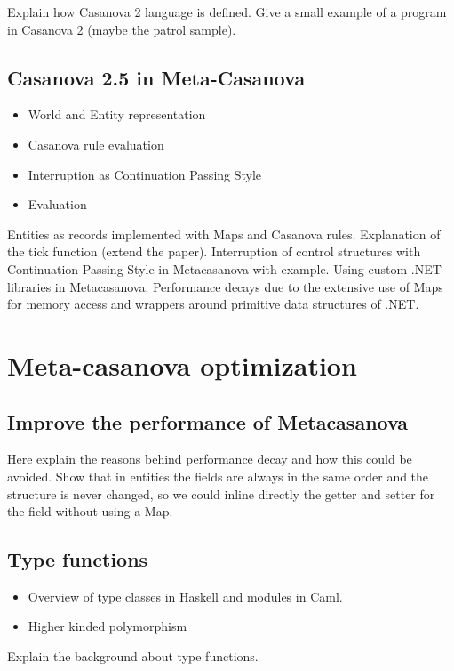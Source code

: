 \documentclass[8pt,a5paper]{extbook}
\begin{document}
Explain how Casanova 2 language is defined. Give a small example of a program in Casanova 2 (maybe the patrol sample). 
	
\section{Casanova 2.5 in Meta-Casanova}
\begin{itemize}[noitemsep]
	\item World and Entity representation
	\item Casanova rule evaluation
	\item Interruption as Continuation Passing Style
	\item Evaluation
\end{itemize}
	
Entities as records implemented with Maps and Casanova rules. Explanation of the tick function (extend the paper). Interruption of control structures with Continuation Passing Style in Metacasanova with example.
Using custom .NET libraries in Metacasanova. Performance decays due to the extensive use of Maps for memory access and wrappers around primitive data structures of .NET.

\chapter{Meta-casanova optimization}


\section{Improve the performance of Metacasanova}
Here explain the reasons behind performance decay and how this could be avoided. Show that in entities the fields are always in the same order and the structure is never changed, so we could inline directly the getter and setter for the field without using a Map.

\section{Type functions}
\begin{itemize}[noitemsep]
	\item Overview of type classes in Haskell and modules in Caml.
	\item Higher kinded polymorphism
\end{itemize}

Explain the background about type functions.
\end{document}
